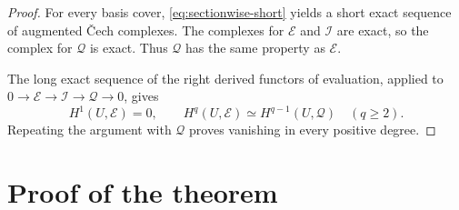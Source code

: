 \documentclass[11pt]{article}
\theoremstyle{definition}
\theoremstyle{remark}
\begin{document}
\begin{proof}
For every basis cover, \eqref{eq:sectionwise-short} yields a
short exact sequence of augmented \v{C}ech complexes. The
complexes for \(\mathcal E\) and \(\mathcal I\) are exact, so the
complex for \(\mathcal Q\) is exact. Thus \(\mathcal Q\) has the
same property as \(\mathcal E\).

The long exact sequence of the right derived functors of
evaluation, applied to
\(0\to\mathcal E\to\mathcal I\to\mathcal Q\to0\), gives
\[
H^1(U,\mathcal E)=0,\qquad
H^q(U,\mathcal E)\simeq H^{q-1}(U,\mathcal Q)\quad(q\ge2).
\]
Repeating the argument with \(\mathcal Q\) proves vanishing in
every positive degree.
\end{proof}

\section{Proof of the theorem}
\end{document}
